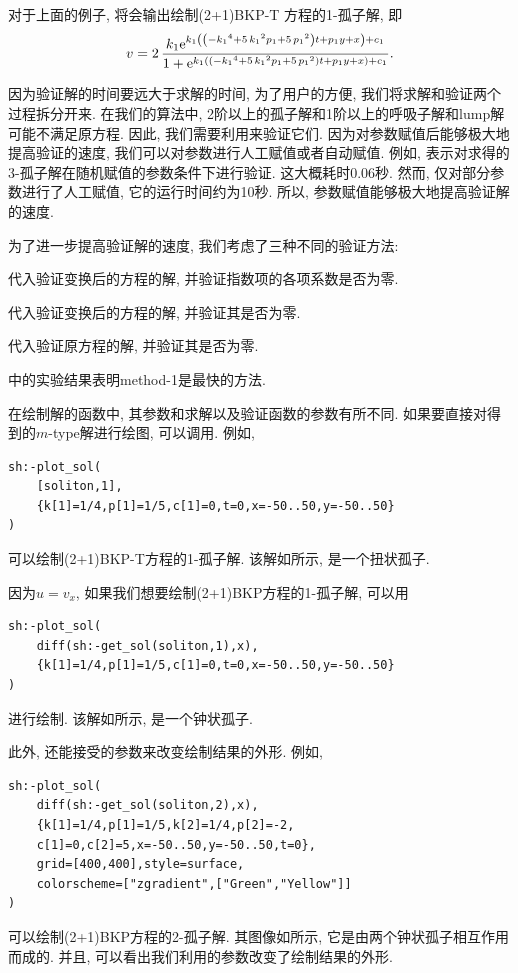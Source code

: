 对于上面的例子, 将会输出绘制(2+1)BKP-T 方程的1-孤子解, 即 
\begin{equation}
v=2\,{\frac {k_{{1}}{{\rm e}^{k_{{1}} \left(  \left( -{k_{{1}}}^{4}+5\,{
k_{{1}}}^{2}p_{{1}}+5\,{p_{{1}}}^{2} \right) t+p_{{1}}y+x \right)+c_1 }}}{
1+{{\rm e}^{k_{{1}} \left(  \left( -{k_{{1}}}^{4}+5\,{k_{{1}}}^{2}p_{{
1}}+5\,{p_{{1}}}^{2} \right) t+p_{{1}}y+x \right)+c_1 }}}}.
\end{equation}

因为验证解的时间要远大于求解的时间, 为了用户的方便, 我们将求解和验证两个过程拆分开来. 在我们的算法中, 2阶以上的孤子解和1阶以上的呼吸子解和lump解可能不满足原方程. 因此, 我们需要利用来验证它们. 因为对参数赋值后能够极大地提高验证的速度, 我们可以对参数进行人工赋值或者自动赋值. 例如,  表示对求得的3-孤子解在随机赋值的参数条件下进行验证. 这大概耗时0.06秒. 然而, 仅对部分参数进行了人工赋值, 它的运行时间约为10秒. 所以, 参数赋值能够极大地提高验证解的速度. 

为了进一步提高验证解的速度, 我们考虑了三种不同的验证方法: 
\begin{compactenum}[method-1:]
\item 代入验证变换后的方程的解, 并验证指数项的各项系数是否为零.
\item 代入验证变换后的方程的解, 并验证其是否为零.
\item 代入验证原方程的解, 并验证其是否为零.
\end{compactenum}
中的实验结果表明method-1是最快的方法. 

在绘制解的函数中, 其参数和求解以及验证函数的参数有所不同. 如果要直接对得到的$m$-type解进行绘图, 可以调用. 例如, 
\begin{verbatim}
sh:-plot_sol(
    [soliton,1],
    {k[1]=1/4,p[1]=1/5,c[1]=0,t=0,x=-50..50,y=-50..50}
)
\end{verbatim}
可以绘制(2+1)BKP-T方程的1-孤子解. 该解如所示, 是一个扭状孤子.

因为$u=v_x$, 如果我们想要绘制(2+1)BKP方程的1-孤子解, 可以用 
\begin{verbatim}
sh:-plot_sol(
    diff(sh:-get_sol(soliton,1),x),
    {k[1]=1/4,p[1]=1/5,c[1]=0,t=0,x=-50..50,y=-50..50}
)
\end{verbatim} 
进行绘制. 该解如所示, 是一个钟状孤子.

此外, 还能接受的参数来改变绘制结果的外形. 例如, 
\begin{verbatim}
sh:-plot_sol(
    diff(sh:-get_sol(soliton,2),x),
    {k[1]=1/4,p[1]=1/5,k[2]=1/4,p[2]=-2,
    c[1]=0,c[2]=5,x=-50..50,y=-50..50,t=0},
    grid=[400,400],style=surface,
    colorscheme=["zgradient",["Green","Yellow"]]
)
\end{verbatim} 
可以绘制(2+1)BKP方程的2-孤子解. 其图像如所示, 它是由两个钟状孤子相互作用而成的. 并且, 可以看出我们利用的参数改变了绘制结果的外形.

